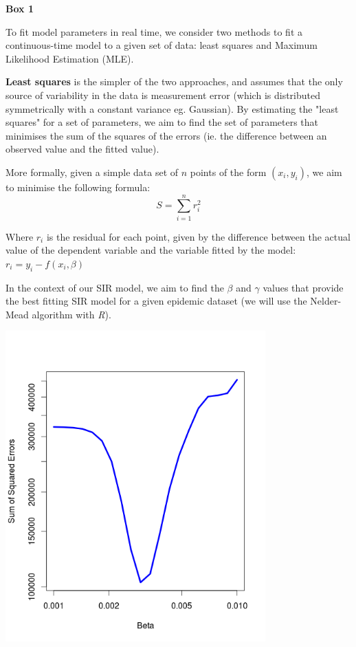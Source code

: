 \newpage
\begin{framed}
{\begin{center}{\bf Box 1}\end{center}}
To fit model parameters in real time, we consider two methods to fit a continuous-time model to a given set of data: least squares and Maximum Likelihood Estimation (MLE).

{\bf Least squares} is the simpler of the two approaches, and assumes that the only source of variability in the data is measurement error (which is distributed symmetrically with a constant variance eg. Gaussian). By estimating the "least squares" for a set of parameters, we aim to find the set of parameters that minimises the sum of the squares of the errors (ie. the difference between an observed value and the fitted value). 

More formally, given a simple data set of $n$ points of the form $(x_i, y_i)$, we aim to minimise the following formula:
\begin{equation*}
S = \sum\limits_{i=1}^n r_{i}^2
\end{equation*}

Where $r_i$ is the residual for each point, given by the difference between the actual value of the dependent variable and the variable fitted by the model: $r_i = y_i - f(x_i, \beta)$

In the context of our SIR model, we aim to find the $\beta$ and $\gamma$ values that provide the best fitting SIR model for a given epidemic dataset (we will use the Nelder-Mead algorithm with \emph{R}).\cite{marily2013}

{\begin{center} \includegraphics[width=100mm]{sse.png}\end{center}}


\end{framed}
